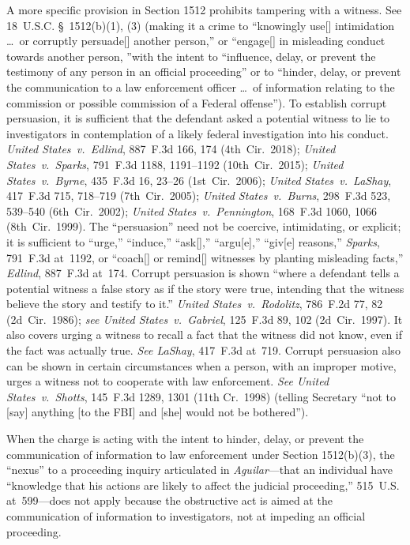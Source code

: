 A more specific provision in Section 1512 prohibits tampering with a witness.
See 18~U.S.C. \S~1512(b)(1), (3) (making it a crime to ``knowingly use[] intimidation \dots\ or corruptly persuade[] another person,'' or ``engage[] in misleading conduct towards another person, ''with the intent to ``influence, delay, or prevent the testimony of any person in an official proceeding'' or to ``hinder, delay, or prevent the communication to a law enforcement officer \dots\ of information relating to the commission or possible commission of a Federal offense'').
To establish corrupt persuasion, it is sufficient that the defendant asked a potential witness to lie to investigators in contemplation of a likely federal investigation into his conduct.
\textit{United States~v.\ Edlind}, 887~F.3d 166, 174 (4th~Cir.~2018);
\textit{United States~v.\ Sparks}, 791~F.3d 1188, 1191--1192 (10th~Cir.~2015);
\textit{United States~v.\ Byrne}, 435~F.3d 16, 23--26 (1st~Cir.~2006);
\textit{United States~v.\ LaShay}, 417~F.3d 715, 718--719 (7th~Cir.~2005);
\textit{United States~v.\ Burns}, 298~F.3d 523, 539--540 (6th~Cir.~2002);
\textit{United States~v.\ Pennington}, 168~F.3d 1060, 1066 (8th~Cir.~1999).
The ``persuasion'' need not be coercive, intimidating, or explicit;
it is sufficient to ``urge,'' ``induce,'' ``ask[],'' ``argu[e],'' ``giv[e] reasons,''
\textit{Sparks}, 791~F.3d at~1192, or ``coach[] or remind[] witnesses by planting misleading facts,''
\textit{Edlind}, 887~F.3d at~174.
Corrupt persuasion is shown ``where a defendant tells a potential witness a false story as if the story were true, intending that the witness believe the story and testify to it.''
\textit{United States~v.\ Rodolitz}, 786~F.2d 77, 82 (2d~Cir.~1986);
\textit{see United States~v.\ Gabriel}, 125~F.3d 89, 102 (2d~Cir.~1997).
It also covers urging a witness to recall a fact that the witness did not know, even if the fact was actually true.
\textit{See LaShay}, 417~F.3d at~719.
Corrupt persuasion also can be shown in certain circumstances when a person, with an improper motive, urges a witness not to cooperate with law enforcement.
\textit{See United States~v.\ Shotts}, 145~F.3d 1289, 1301 (11th Cr.~1998) (telling Secretary ``not to [say] anything [to the FBI] and [she] would not be bothered'').

When the charge is acting with the intent to hinder, delay, or prevent the communication of information to law enforcement under Section 1512(b)(3), the ``nexus'' to a proceeding inquiry articulated in \textit{Aguilar}---that an individual have ``knowledge that his actions are likely to affect the judicial proceeding,'' 515~U.S. at~599---does not apply because the obstructive act is aimed at the communication of information to investigators, not at impeding an official proceeding.

